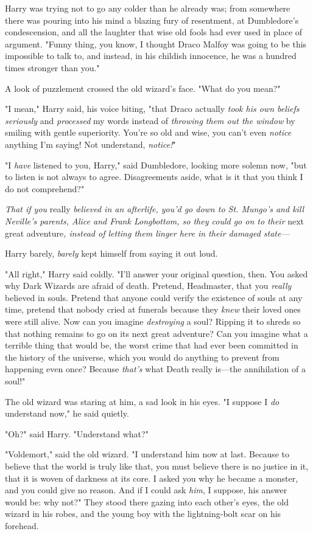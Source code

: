 Harry was trying not to go any colder than he already was; from somewhere there
was pouring into his mind a blazing fury of resentment, at Dumbledore’s
condescension, and all the laughter that wise old fools had ever used in place
of argument. "Funny thing, you know, I thought Draco Malfoy was going to be
this impossible to talk to, and instead, in his childish innocence, he was a
hundred times stronger than you."

A look of puzzlement crossed the old wizard’s face. "What do you mean?"

"I mean," Harry said, his voice biting, "that Draco actually \emph{took his own
beliefs seriously} and \emph{processed} my words instead of \emph{throwing them
out the window} by smiling with gentle superiority. You’re so old and wise, you
can’t even \emph{notice} anything I’m saying! Not understand, \emph{notice!}"

"I \emph{have} listened to you, Harry," said Dumbledore, looking more solemn
now, "but to listen is not always to agree. Disagreements aside, what is it
that you think I do not comprehend?"

\emph{That if you} really \emph{believed in an afterlife, you’d go down to St.
Mungo’s and kill Neville’s parents, Alice and Frank Longbottom, so they could
go on to their} next great adventure\emph{, instead of letting them linger here
in their damaged state—}

Harry barely, \emph{barely} kept himself from saying it out loud.

"All right," Harry said coldly. "I’ll answer your original question, then. You
asked why Dark Wizards are afraid of death. Pretend, Headmaster, that you
\emph{really} believed in souls. Pretend that anyone could verify the existence
of souls at any time, pretend that nobody cried at funerals because they
\emph{knew} their loved ones were still alive. Now can you imagine
\emph{destroying} a soul? Ripping it to shreds so that nothing remains to go on
its next great adventure? Can you imagine what a terrible thing that would be,
the worst crime that had ever been committed in the history of the universe,
which you would do anything to prevent from happening even once? Because
\emph{that’s} what Death really is—the annihilation of a soul!"

The old wizard was staring at him, a sad look in his eyes. "I suppose I
\emph{do} understand now," he said quietly.

"Oh?" said Harry. "Understand what?"

"Voldemort," said the old wizard. "I understand him now at last. Because to
believe that the world is truly like that, you must believe there is no justice
in it, that it is woven of darkness at its core. I asked you why he became a
monster, and you could give no reason. And if I could ask \emph{him}, I
suppose, his answer would be: why not?"
\later
They stood there gazing into each other’s eyes, the old wizard in his robes,
and the young boy with the lightning-bolt scar on his forehead.

